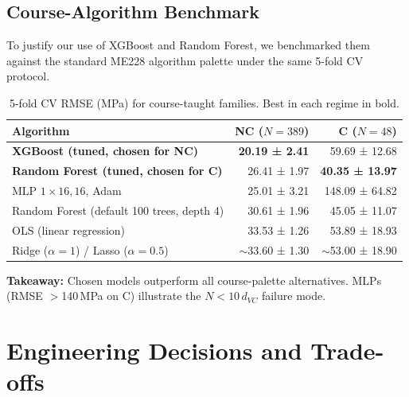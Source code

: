 \documentclass[10pt,a4paper]{article} %
\begin{document}
\subsection{Course-Algorithm Benchmark}
To justify our use of XGBoost and Random Forest, we benchmarked them against the standard ME228 algorithm palette under the same 5-fold CV protocol.

\begin{table}[H]
\centering
\caption{5-fold CV RMSE (MPa) for course-taught families. Best in each regime in bold.}
\label{tab:bench}
\begin{tabular}{lrr}
\toprule
\textbf{Algorithm} & \textbf{NC ($N{=}389$)} & \textbf{C ($N{=}48$)} \\
\midrule
\textbf{XGBoost (tuned, chosen for NC)}            & \textbf{20.19 ± 2.41} & 59.69 ± 12.68 \\
\textbf{Random Forest (tuned, chosen for C)}       & 26.41 ± 1.97          & \textbf{40.35 ± 13.97} \\
MLP $1\times16{,}16$, Adam                         & 25.01 ± 3.21          & 148.09 ± 64.82 \\
Random Forest (default 100 trees, depth 4)         & 30.61 ± 1.96          & 45.05 ± 11.07 \\
OLS (linear regression)                            & 33.53 ± 1.26          & 53.89 ± 18.93 \\
Ridge ($\alpha=1$) / Lasso ($\alpha=0.5$)          & $\sim$33.60 ± 1.30    & $\sim$53.00 ± 18.90 \\
\bottomrule
\end{tabular}
\end{table}

\textbf{Takeaway:} Chosen models outperform all course-palette alternatives. MLPs (RMSE $>$140\,MPa on C) illustrate the $N < 10\,d_{VC}$ failure mode.
\section{Engineering Decisions and Trade-offs}
\end{document}
